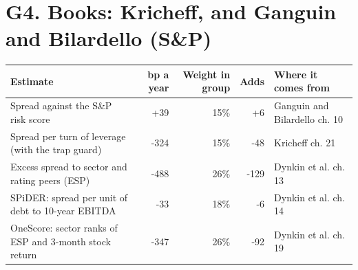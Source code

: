 \documentclass[11pt,a4paper]{article}
\begin{document}
\section*{G4. Books: Kricheff, and Ganguin and Bilardello (S\&P)}
\par\noindent{}
\begin{center}\footnotesize\setlength{\tabcolsep}{3.5pt}\begin{tabular}{@{}p{6.2cm}rrrp{4.2cm}@{}}\toprule
Estimate & bp a year & Weight in group & Adds & Where it comes from \\\midrule
Spread against the S\&P risk score & +39 & 15\% & +6 & Ganguin and Bilardello ch. 10 \\
Spread per turn of leverage (with the trap guard) & -324 & 15\% & -48 & Kricheff ch. 21 \\
Excess spread to sector and rating peers (ESP) & -488 & 26\% & -129 & Dynkin et al. ch. 13 \\
SPiDER: spread per unit of debt to 10-year EBITDA & -33 & 18\% & -6 & Dynkin et al. ch. 14 \\
OneScore: sector ranks of ESP and 3-month stock return & -347 & 26\% & -92 & Dynkin et al. ch. 19 \\
\bottomrule\end{tabular}\end{center}
\end{document}
